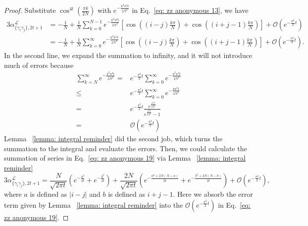 \documentclass{article}
\newcommand{\alpl}{\alpha_{\{\gamma_i\gamma_j\}, 2t+1}^{\mathscr{L}}}
\begin{document}
\begin{proof}
Substitute $\cos ^{4 t}\left(\frac{\pi k}{2 N}\right)$ with $e^{-\frac{k^2 \pi^2 t}{2N^2}}$ in Eq.~\eqref{eq: zz anonymous 13}, we have 
\begin{align}
3\alpl& =-\frac{1}{N}+\frac{1}{N} \sum_{k=0}^{N-1} e^{-\frac{k^2 \pi^2 t}{2 N^2}}\left[\cos \left((i-j) \frac{k \pi}{N}\right)+\cos \left((i+j-1) \frac{k \pi}{N}\right)\right]+\mathcal{O}\left(e^{-\frac{\pi^2}{2}t}\right)\\
& =-\frac{1}{N}+\frac{1}{N} \sum_{k=0}^{\infty}e^{-\frac{k^2 \pi^2 t}{2 N^2}}\left[\cos \left((i-j) \frac{k \pi}{N}\right)+\cos \left((i+j-1) \frac{k \pi}{N}\right)\right]+\mathcal{O}\left(e^{-\frac{\pi^2}{2}t}\right).
\label{eq: zz anonymous 19}
\end{align}
In the second line, we expand the summation to infinity, and it will not introduce much of errors because 
\begin{align*}
    \sum_{k=N}^{\infty} e^{-\frac{k^2 \pi^2 t}{2 N^2}} =& e^{-\frac{\pi^2}{2}t}\sum_{k=0}^{\infty} e^{-\frac{k^2 \pi^2 t}{2 N^2}} \\
    \leq& e^{-\frac{\pi^2}{2}t}\sum_{k=0}^{\infty} e^{-\frac{k \pi^2 t}{2 N^2}} \\
    =& e^{-\frac{\pi^2}{2}t} \frac{e^{\frac{\pi^2 t}{2 N^2}}}{e^{\frac{\pi^2 t}{2 N^2}} -1 } \\
    =& \mathcal{O}\left(e^{-\frac{\pi^2}{2}t}\right)
\end{align*}
Lemma ~\ref{lemma: integral reminder} did the second job, which turns the summation to the integral and evaluate the errors. Then, we could calculate the summation of series in Eq.~\eqref{eq: zz anonymous 19} via Lemma ~\ref{lemma: integral reminder}
\begin{equation}
    3\alpl = \frac{N}{\sqrt{2\pi t}} (e^{-\frac{a^2}{2t}}+ e^{-\frac{b^2}{2t}})
    + \frac{2N}{\sqrt{2\pi t}}(e^{-\frac{a^2+2N(N-a)}{2t}}+ e^{-\frac{b^2+2N(N-b)}{2t}}) + \mathcal{O}\left(e^{-\frac{\pi^2}{2}t}\right),
\end{equation}
where $a$ is defined as $|i-j|$ and $b$ is defined as $i+j-1$. Here we absorb the error term given by Lemma ~\ref{lemma: integral reminder} into the $\mathcal{O}\left(e^{-\frac{\pi^2}{2}t}\right)$ in Eq.~\eqref{eq: zz anonymous 19}.


\end{proof}
\end{document}

